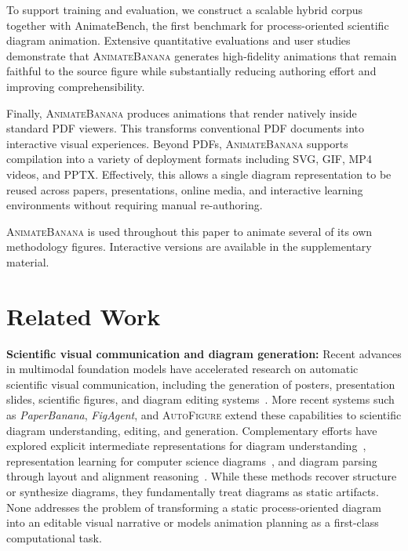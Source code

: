 \documentclass{article} %
\begin{document}
To support training and evaluation, we construct a scalable hybrid corpus together with AnimateBench, the first benchmark for process-oriented scientific diagram animation. Extensive quantitative evaluations and user studies demonstrate that \textsc{AnimateBanana} generates high-fidelity animations that remain faithful to the source figure while substantially reducing authoring effort and improving comprehensibility.

Finally, \textsc{AnimateBanana} produces animations that render natively inside standard PDF viewers. This transforms conventional PDF documents into interactive visual experiences. Beyond PDFs, \textsc{AnimateBanana} supports compilation into a variety of deployment formats including SVG, GIF, MP4 videos, and PPTX. Effectively, this allows a single diagram representation to be reused across papers, presentations, online media, and interactive learning environments without requiring manual re-authoring.

\textsc{AnimateBanana} is used throughout this paper to animate several of its own methodology figures. Interactive versions are available in the supplementary material.

\section{Related Work}

\noindent\textbf{Scientific visual communication and diagram generation:} Recent advances in multimodal foundation models have accelerated research on automatic scientific visual communication, including the generation of posters, presentation slides, scientific figures, and diagram editing systems~\cite{posteragent,pptagent}. More recent systems such as \emph{PaperBanana}, \emph{FigAgent}, and \textsc{AutoFigure} extend these capabilities to scientific diagram understanding, editing, and generation. Complementary efforts have explored explicit intermediate representations for diagram understanding~\cite{explicitdiagram}, representation learning for computer science diagrams~\cite{rlcsdia}, and diagram parsing through layout and alignment reasoning~\cite{alignmentdiagram,layoutrecovery}. While these methods recover structure or synthesize diagrams, they fundamentally treat diagrams as static artifacts. None addresses the problem of transforming a static process-oriented diagram into an editable visual narrative or models animation planning as a first-class computational task.
\end{document}
